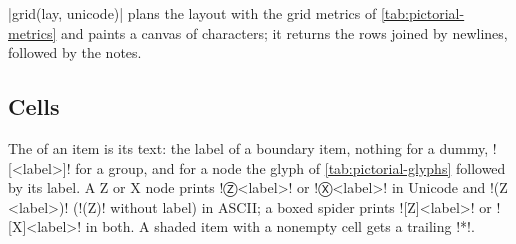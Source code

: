 {\py|grid(lay, unicode)| plans the layout with the grid metrics of \cref{tab:pictorial-metrics}
and paints a canvas of characters; it returns the rows joined by newlines, followed by the
notes.

\subsection{Cells}\label{sec:pictorial-cells}

The  of an item is its text: the label of a boundary item, nothing for a dummy,
\code![<label>]! for a group, and for a node the glyph of \cref{tab:pictorial-glyphs} followed by
its label. A Z or X node prints \pgi!Ⓩ<label>! or \pgi!Ⓧ<label>! in Unicode and
\code!(Z <label>)! (\code!(Z)! without label) in ASCII; a boxed spider prints
\code![Z]<label>! or \code![X]<label>! in both. A shaded item with a nonempty cell gets a
trailing \code!*!.

}
